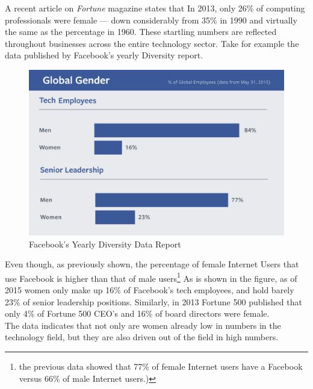 \documentclass[12pt]{article}
\begin{document}
	A recent article on \textit{Fortune} magazine states that In 2013, only 26\% of computing professionals were female — down considerably from 35\% in 1990 and virtually the same as the percentage in 1960\cite{fortune}. These startling numbers are reflected throughout businesses across the entire technology sector. Take for example the data published by Facebook's yearly Diversity report. \\
	
	 	\begin{figure}[H]
	 		\begin{center}
	 			\includegraphics[width = \textwidth, keepaspectratio]{FBDiversityReport}
	 			\caption{Facebook’s Yearly Diversity Data Report}
	 		\end{center}
	 	\end{figure}	
	 	
	Even though, as previously shown, the percentage of female Internet Users  that use Facebook is higher than that of male users\footnote{the previous data showed that 77\% of female Internet users have a Facebook versus 66\% of male Internet users.)} As is shown in the figure, as of 2015 women only make up 16\% of Facebook's tech employees, and hold barely 23\% of senior leadership positions. Similarly, in 2013 Fortune 500 published that only 4\% of Fortune 500 CEO's and 16\% of board directors were female. \\
	
	The data indicates that not only are women already low in numbers in the technology field, but they are also driven out of the field in high numbers.\\
\end{document}
